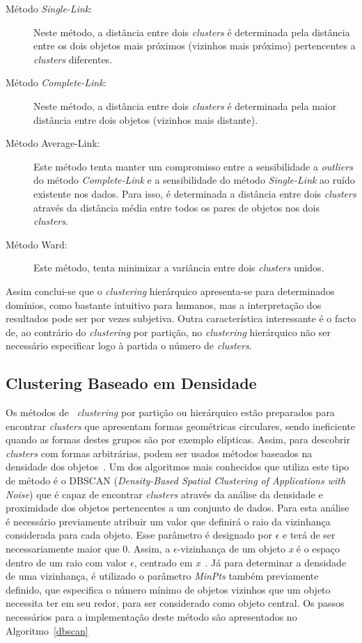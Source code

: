 \begin{description}
\item[Método \textit{Single-Link}:] Neste método, a distância entre dois \textit{clusters} é determinada pela distância entre os dois objetos mais próximos (vizinhos mais próximo) pertencentes a \textit{clusters} diferentes.
\item[Método \textit{Complete-Link}:] Neste método, a distância entre dois \textit{clusters} é determinada pela maior distância entre dois objetos (vizinhos mais distante).
\item[Método Average-Link:] Este método tenta manter um compromisso entre a sensibilidade a \textit{outliers} do método \textit{Complete-Link} e a sensibilidade do método \textit{Single-Link} ao ruído existente nos dados. Para isso, é determinada a distância entre dois \textit{clusters} através da distância média entre todos os pares de objetos nos dois \textit{clusters}.
\item[Método Ward:] Este método, tenta minimizar a variância entre dois \textit{clusters} unidos.
\end{description}

Assim conclui-se que o \textit{clustering} hierárquico apresenta-se para determinados domínios, como bastante intuitivo para humanos, mas a interpretação dos resultados pode ser por vezes subjetiva. Outra característica interessante é o facto de, ao contrário do \textit{clustering} por partição, no \textit{clustering} hierárquico não ser necessário especificar logo à partida o número de \textit{clusters}. 

\subsection{Clustering Baseado em Densidade} \label{subsec:dbscan} 

Os métodos de ~\textit{clustering} por partição ou hierárquico estão preparados para encontrar \textit{clusters} que apresentam formas geométricas circulares, sendo ineficiente quando as formas destes grupos são por exemplo elípticas. Assim, para descobrir \textit{clusters} com formas arbitrárias, podem ser usados métodos baseados na densidade dos objetos~\cite{Han2006}. Um dos algoritmos mais conhecidos que utiliza este tipo de método é o DBSCAN (\textit{Density-Based Spatial Clustering of Applications with Noise}) que é capaz de encontrar \textit{clusters} através da análise da densidade e proximidade dos objetos pertencentes a um conjunto de dados. Para esta análise é necessário previamente atribuir um valor que definirá o raio da vizinhança considerada para cada objeto. Esse parâmetro é designado por $ \epsilon $ e terá de ser necessariamente maior que 0. Assim,  a $ \epsilon $-vizinhança de um objeto \textit{x} é o espaço dentro de um raio com valor $ \epsilon $, centrado em \textit{x}~\cite{Han2006}. Já para determinar a densidade de uma vizinhança, é utilizado o parâmetro \textit{MinPts} também previamente definido, que especifica o número mínimo de objetos vizinhos que um objeto necessita ter em seu redor, para ser considerado como objeto central.
Os passos necessários para a implementação deste método são apresentados no Algoritmo~\ref{dbscan}

